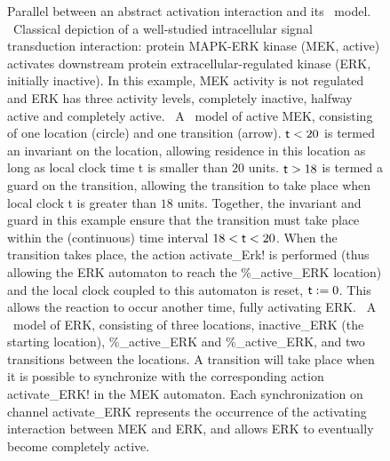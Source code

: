 \begin{figure}[!hb]
\begin{center}
\qquad
{}
\end{center}
\caption{Parallel between an abstract activation interaction and its \tas\ model.
{\bf \protect{}}~Classical depiction of a well-studied intracellular signal transduction interaction: protein
MAPK-ERK kinase (MEK, active) activates downstream protein extracellular-regulated kinase (ERK, initially inactive).
In this example, MEK activity is not regulated and ERK has three activity levels,
completely inactive, halfway active and completely active.
{\bf \protect{}}~A \ta\ model of active MEK, consisting of one location (circle) and one
transition (arrow). ${\sf t} < 20$ is termed an invariant on the location, allowing residence in this location as long as local
clock time {\sf t} is smaller than $20$ units. ${\sf t} > 18$ is termed a guard on the transition, allowing the
transition to take place when local clock {\sf t} is greater than $18$ units. Together, the invariant and guard in this
example ensure that the transition must take place within the (continuous) time interval $18 < {\sf t} < 20$. When the
transition takes place, the action {\sf activate\_Erk!} is performed (thus allowing the ERK automaton to reach the {\%\_active\_ERK} location) and the local clock coupled to this automaton is reset, ${\sf t} := 0$.
This allows the reaction to occur another time, fully activating ERK.
{\bf \protect{}}~A \ta\ model of ERK, consisting of three locations, {\sf inactive\_ERK}
(the starting location), {\%\_active\_ERK} and {\%\_active\_ERK},
and two transitions between the locations. A transition will take place when it is possible to synchronize with
the corresponding action {\sf activate\_ERK!} in the MEK automaton.
Each synchronization on channel {\sf activate\_ERK} represents the occurrence of the activating
interaction between MEK and ERK, and allows ERK to eventually become completely active.}\label{fig:abstraction-mek-erk}
\end{figure}





